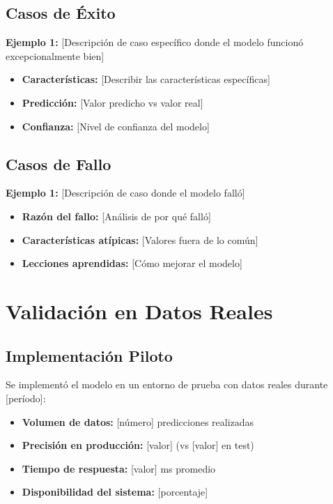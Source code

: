 \subsection{Casos de Éxito}

\textbf{Ejemplo 1:} [Descripción de caso específico donde el modelo funcionó excepcionalmente bien]

\begin{itemize}
    \item \textbf{Características:} [Describir las características específicas]
    \item \textbf{Predicción:} [Valor predicho vs valor real]
    \item \textbf{Confianza:} [Nivel de confianza del modelo]
\end{itemize}

\subsection{Casos de Fallo}

\textbf{Ejemplo 1:} [Descripción de caso donde el modelo falló]

\begin{itemize}
    \item \textbf{Razón del fallo:} [Análisis de por qué falló]
    \item \textbf{Características atípicas:} [Valores fuera de lo común]
    \item \textbf{Lecciones aprendidas:} [Cómo mejorar el modelo]
\end{itemize}

\section{Validación en Datos Reales}

\subsection{Implementación Piloto}

Se implementó el modelo en un entorno de prueba con datos reales durante [período]:

\begin{itemize}
    \item \textbf{Volumen de datos:} [número] predicciones realizadas
    \item \textbf{Precisión en producción:} [valor] (vs [valor] en test)
    \item \textbf{Tiempo de respuesta:} [valor] ms promedio
    \item \textbf{Disponibilidad del sistema:} [porcentaje]%
\end{itemize}

